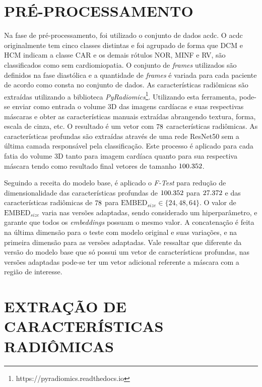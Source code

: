 \section{PRÉ-PROCESSAMENTO}
\label{subsec:cap4_preprocess}

Na fase de pré-processamento, foi utilizado o conjunto de dados \gls{acdc}. O \gls{acdc} originalmente tem cinco classes distintas e foi agrupado de forma que DCM e HCM indicam a classe CAR e os demais rótulos NOR, MINF e RV, são classificados como sem cardiomiopatia. O conjunto de \textit{frames} utilizados são definidos na fase diastólica e a quantidade de \textit{frames} é variada para cada paciente de acordo como consta no conjunto de dados. As características radiômicas são extraídas utilizando a biblioteca \textit{PyRadiomics}\footnote{https://pyradiomics.readthedocs.io}. Utilizando esta ferramenta, pode-se enviar como entrada o volume 3D das imagens cardíacas e suas respectivas máscaras e obter as características manuais extraídas abrangendo textura, forma, escala de cinza, etc. O resultado é um vetor com $78$ características radiômicas. As características profundas são extraídas através de uma rede ResNet50 sem a última camada responsável pela classificação. Este processo é aplicado para cada fatia do volume 3D tanto para imagem cardíaca quanto para sua respectiva máscara tendo como resultado final vetores de tamanho $100.352$. 

Seguindo a receita do modelo base, é aplicado o \textit{F-Test} para redução de dimensionalidade das características profundas de $100.352$ para $27.372$ e das características radiômicas de $78$ para $\text{EMBED}_{size} \in \{24, 48, 64\}$. O valor de $\text{EMBED}_{size}$ varia nas versões adaptadas, sendo considerado um hiperparâmetro, e garante que todos os \textit{embeddings} possuam o mesmo valor. A concatenação é feita na última dimensão para o teste com modelo original e suas variações, e na primeira dimensão para as versões adaptadas. Vale ressaltar que diferente da versão do modelo base que só possui um vetor de características profundas, nas versões adaptadas pode-se ter um vetor adicional referente a máscara com a região de interesse. 

\section{EXTRAÇÃO DE CARACTERÍSTICAS RADIÔMICAS}
\label{subsec:cap4_caracteristicas_radiomicas}

